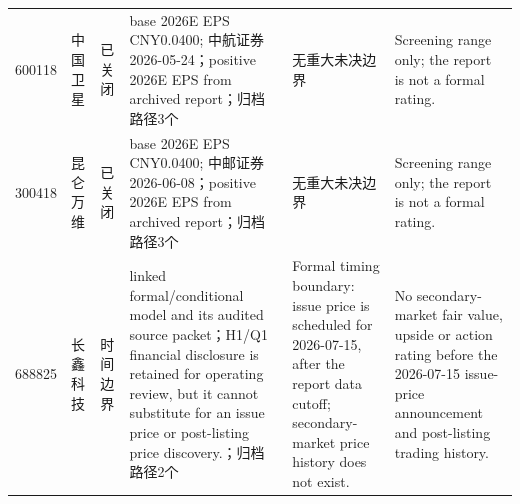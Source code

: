 \begin{longtable}{L{1.00cm}L{1.40cm}L{1.45cm}L{2.85cm}L{2.50cm}L{3.05cm}}
600118 & 中国卫星 & 已关闭 & base 2026E EPS CNY0.0400; 中航证券 2026-05-24；positive 2026E EPS from archived report；归档路径3个 & 无重大未决边界 & Screening range only; the report is not a formal rating. \\
300418 & 昆仑万维 & 已关闭 & base 2026E EPS CNY0.0400; 中邮证券 2026-06-08；positive 2026E EPS from archived report；归档路径3个 & 无重大未决边界 & Screening range only; the report is not a formal rating. \\
688825 & 长鑫科技 & 时间边界 & linked formal/conditional model and its audited source packet；H1/Q1 financial disclosure is retained for operating review, but it cannot substitute for an issue price or post-listing price discovery.；归档路径2个 & Formal timing boundary: issue price is scheduled for 2026-07-15, after the report data cutoff; secondary-market price history does not exist. & No secondary-market fair value, upside or action rating before the 2026-07-15 issue-price announcement and post-listing trading history. \\
\bottomrule
\end{longtable}
\normalsize
{}
